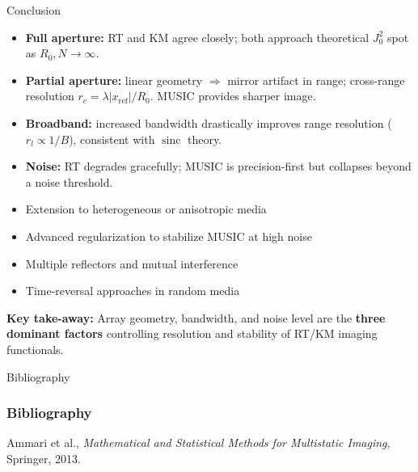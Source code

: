 \documentclass{beamer}
\begin{document}
\begin{frame}{Conclusion}
  \scriptsize
  \vspace{-0.1cm}
  \begin{tcolorbox}[keybox, title=Summary of Findings, top=2pt, bottom=2pt]
    \begin{itemize}\setlength\itemsep{1pt}
      \item \textbf{Full aperture:} RT and KM agree closely; both approach theoretical $J_0^2$ spot as $R_0,N\!\to\!\infty$.
      \item \textbf{Partial aperture:} linear geometry $\Rightarrow$ mirror artifact in range; cross-range resolution $r_c\!=\!\lambda|x_{\mathrm{ref}}|/R_0$. MUSIC provides sharper image.
      \item \textbf{Broadband:} increased bandwidth drastically improves range resolution ($r_l \!\propto\! 1/B$), consistent with $\operatorname{sinc}$ theory.
      \item \textbf{Noise:} RT degrades gracefully; MUSIC is precision-first but collapses beyond a noise threshold.
    \end{itemize}
  \end{tcolorbox}


  \begin{tcolorbox}[warnbox, title=Perspectives, top=2pt, bottom=2pt]
    \begin{itemize}\setlength\itemsep{1pt}
      \item Extension to heterogeneous or anisotropic media
      \item Advanced regularization to stabilize MUSIC at high noise
      \item Multiple reflectors and mutual interference
      \item Time-reversal approaches in random media
    \end{itemize}
  \end{tcolorbox}


  \begin{tcolorbox}[keybox, top=2pt, bottom=2pt]
    \textbf{Key take-away:} Array geometry, bandwidth, and noise level are the \textbf{three dominant factors} controlling resolution and stability of RT/KM imaging functionals.
  \end{tcolorbox}
\end{frame}


\begingroup
{}

\begin{frame}[allowframebreaks]{Bibliography}
\frametitle{Bibliography}
Ammari et al., \textit{Mathematical and Statistical Methods for Multistatic Imaging}, Springer, 2013.
\end{frame}
\endgroup
\end{document}
